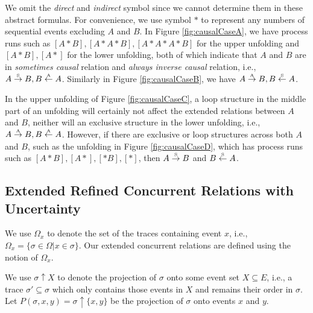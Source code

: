 \documentclass{llncs}
\begin{document}
We omit the \textit{direct} and \textit{indirect} symbol since we cannot determine them in these abstract formulas. For convenience, we use symbol $*$ to represent any numbers of sequential events excluding $A$ and $B$. In Figure \ref{fig:causalCaseA}, we have process runs such as $[A*B],[A*A*B],[A*A*A*B]$ for the upper unfolding and $[A*B],[A*]$ for the lower unfolding, both of which indicate that $A$ and $B$ are in \textit{sometimes causal} relation and \textit{always inverse causal} relation, i.e., $A\overset{\text{\tiny{S}}}{\rightarrow} B,B\overset{\text{\tiny{A}}}{\leftarrow} A$. Similarly in Figure \ref{fig:causalCaseB}, we have $A\overset{\text{\tiny{A}}}{\rightarrow} B,B\overset{\text{\tiny{S}}}{\leftarrow} A$.

In the upper unfolding of Figure \ref{fig:causalCaseC}, a loop structure in the middle part of an unfolding will certainly not affect the extended relations between $A$ and $B$, neither will an exclusive structure in the lower unfolding, i.e., $A\overset{\text{\tiny{A}}}{\rightarrow} B,B\overset{\text{\tiny{A}}}{\leftarrow} A$. However, if there are exclusive or loop structures across both $A$ and $B$, such as the unfolding in Figure \ref{fig:causalCaseD}, which has process runs such as $[A*B],[A*],[*B],[*]$, then $A\overset{\text{\tiny{S}}}{\rightarrow} B$ and $B\overset{\text{\tiny{S}}}{\leftarrow} A$.

\subsection{Extended Refined Concurrent Relations with Uncertainty}\label{subsec:concurrent}
We use $\Omega_{x}$ to denote the set of the traces containing event $x$, i.e., $\Omega_{x}=\{\sigma\in\Omega|x\in\sigma\}$. Our extended concurrent relations are defined using the notion of $\Omega_{x}$.

We use $\sigma\uparrow X$ to denote the projection of $\sigma$ onto some event set $X\subseteq E$, i.e., a trace $\sigma'\subseteq\sigma$ which only contains those events in $X$ and remains their order in $\sigma$. Let $P(\sigma,x,y)=\sigma\uparrow\{x,y\}$ be the projection of $\sigma$ onto events $x$ and $y$.
\end{document}
